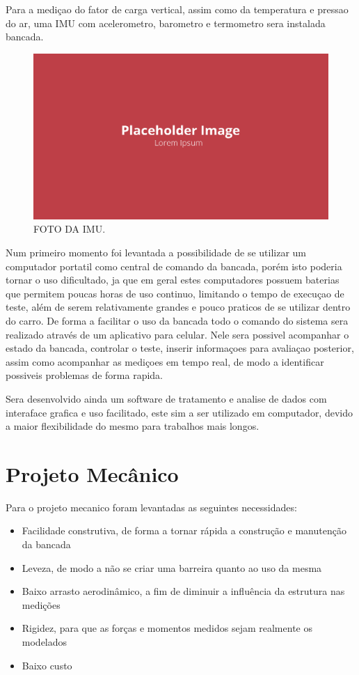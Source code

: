Para a mediçao do fator de carga vertical, assim como da temperatura e pressao do ar, uma IMU com acelerometro, barometro e termometro sera instalada bancada.

\begin{figure}[!ht]
    \centering
    \includegraphics[width=.8\linewidth]{figuras/placeholder.png}
    \caption{FOTO DA IMU\cite{autor}.}
    \label{fig:placeholder}
\end{figure}

Num primeiro momento foi levantada a possibilidade de se utilizar um computador portatil como central de comando da bancada, porém isto poderia tornar o uso dificultado, ja que em geral estes computadores possuem baterias que permitem poucas horas de uso continuo, limitando o tempo de execuçao de teste, além de serem relativamente grandes e pouco praticos de se utilizar dentro do carro. De forma a facilitar o uso da bancada todo o comando do sistema sera realizado através de um aplicativo para celular. Nele sera possivel acompanhar o estado da bancada, controlar o teste, inserir informaçoes para avaliaçao posterior, assim como acompanhar as mediçoes em tempo real, de modo a identificar possiveis problemas de forma rapida.

Sera desenvolvido ainda um software de tratamento e analise de dados com interaface grafica e uso facilitado, este sim a ser utilizado em computador, devido a maior flexibilidade do mesmo para trabalhos mais longos.

\section{Projeto Mecânico}

Para o projeto mecanico foram levantadas as seguintes necessidades:

\begin{itemize}
    \item Facilidade construtiva, de forma a tornar rápida a construção e manutenção da bancada
    \item Leveza, de modo a não se criar uma barreira quanto ao uso da mesma
    \item Baixo arrasto aerodinâmico, a fim de diminuir a influência da estrutura nas medições
    \item Rigidez, para que as forças e momentos medidos sejam realmente os modelados
    \item Baixo custo
\end{itemize}

